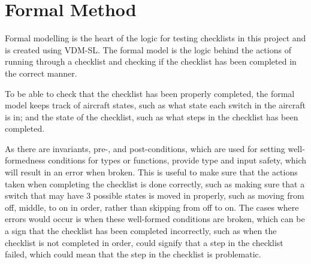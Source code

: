 \documentclass[../dissertation.tex]{subfiles}
\begin{document}
\section{Formal Method}
Formal modelling is the heart of the logic for testing checklists in this project
and is created using VDM-SL.
The formal model is the logic behind the actions of running through a checklist
and checking if the checklist has been completed in the correct manner.

To be able to check that the checklist has been properly completed,
the formal model keeps track of aircraft states, such as what state each switch
in the aircraft is in; and the state of the checklist, such as what steps in the
checklist has been completed.

As there are invariants, pre-, and post-conditions, which are used for setting
well-formedness conditions for types or functions, provide type and input safety,
which will result in an error when broken. This is useful to make sure that
the actions taken when completing the checklist is done correctly, such as making
sure that a switch that may have 3 possible states is moved in properly, such as
moving from off, middle, to on in order, rather than skipping from off to on.
The cases where errors would occur is when these well-formed conditions are broken,
which can be a sign that the checklist has been completed incorrectly, such as
when the checklist is not completed in order, could signify that a step in the checklist
failed, which could mean that the step in the checklist is problematic.
\end{document}
